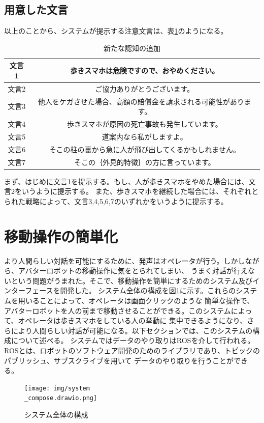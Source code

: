 \documentclass[11pt,a4j]{jreport}
\begin{document}
\subsection{用意した文言}
以上のことから、システムが提示する注意文言は、表\ref{fig: Strategy}のようになる。
\begin{table}[H]
  \centering
  
  \label{fig: Strategy}
  \begin{tabular}{c|c}
      文言1 & 歩きスマホは危険ですので、おやめください。 \\ \hline
      文言2 & ご協力ありがとうございます。 \\ \hline
      文言3 & 他人をケガさせた場合、高額の賠償金を請求される可能性があります。  \\ \hline
      文言4 & 歩きスマホが原因の死亡事故も発生しています。 \\ \hline
      文言5 & 道案内なら私がしますよ。 \\ \hline
      文言6 & そこの柱の裏から急に人が飛び出してくるかもしれません。 \\ \hline
      文言7 & そこの｛外見的特徴｝の方に言っています。 \\ 
  \end{tabular}
  \caption{新たな認知の追加}
\end{table}
まず、はじめに文言1を提示する。もし、人が歩きスマホをやめた場合には、文言2をいうように提示する。
また、歩きスマホを継続した場合には、それぞれとられた戦略によって、文言3,4,5,6,7のいずれかをいうように提示する。
\section{移動操作の簡単化}
より人間らしい対話を可能にするために、発声はオペレータが行う。しかしながら、アバターロボットの移動操作に気をとられてしまい、
うまく対話が行えないという問題がうまれた。そこで、移動操作を簡単にするためのシステム及びインターフェースを開発した。
システム全体の構成を図\ref{pic:systemcompose}に示す。これらのシステムを用いることによって、オペレータは画面クリックのような
簡単な操作で、アバターロボットを人の前まで移動させることができる。このシステムによって、オペレータは歩きスマホをしている人の挙動に
集中できるようになり、さらにより人間らしい対話が可能になる。以下セクションでは、このシステムの構成について述べる。
システムではデータのやり取りはROSを介して行われる。ROSとは、ロボットのソフトウェア開発のためのライブラリであり、トピックのパブリッシュ、サブスクライブを用いて
データのやり取りを行うことができる。
\begin{figure}[H]
  \label{pic:systemcompose}
  \texttt{[image: img/system\\\_compose.drawio.png]}
  \caption{システム全体の構成}
\end{figure}
\end{document}
